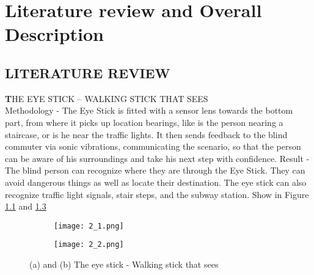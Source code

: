 
\chapter{Literature review and Overall Description} %

\label{Chapter2} %



\section{LITERATURE REVIEW}\label{sec:2.1}

\textbf THE EYE STICK – WALKING STICK THAT SEES\\
Methodology - The Eye Stick is fitted with a sensor lens towards the bottom part, from where it picks up location bearings, like is the person nearing a staircase, or is he near the traffic lights. It then sends feedback to the blind commuter via sonic vibrations, communicating the scenario, so that the person can be aware of his surroundings and take his next step with confidence.
Result - The blind person can recognize where they are through the Eye Stick. They can avoid dangerous things as well as locate their destination. The eye stick can also recognize traffic light signals, stair steps, and the subway station. Show in Figure \ref{fig:2_1} and \ref{fig:2_2}\\

\begin{figure}[t]
	\centering
	\begin{subfigure}[b]{0.4\textwidth}
		\texttt{[image: 2\_1.png]}
		\caption{}
		\label{fig:2_1}
	\end{subfigure}
	\begin{subfigure}[b]{0.39\textwidth}
		\texttt{[image: 2\_2.png]}
		\caption{}
		\label{fig:2_2}
	\end{subfigure}
	\caption{(a) and (b) The eye stick - Walking stick that sees}
\end{figure}

